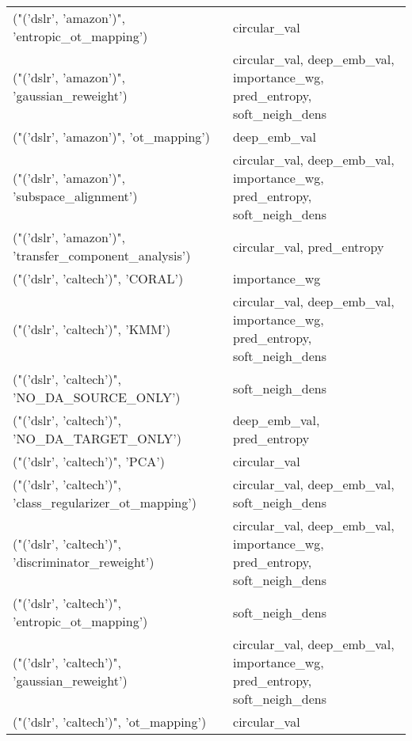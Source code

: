 \begin{tabular}{ll}
 ("('dslr', 'amazon')", 'entropic\_ot\_mapping')             & circular\_val                                                             \\
 ("('dslr', 'amazon')", 'gaussian\_reweight')               & circular\_val, deep\_emb\_val, importance\_wg, pred\_entropy, soft\_neigh\_dens \\
 ("('dslr', 'amazon')", 'ot\_mapping')                      & deep\_emb\_val                                                             \\
 ("('dslr', 'amazon')", 'subspace\_alignment')              & circular\_val, deep\_emb\_val, importance\_wg, pred\_entropy, soft\_neigh\_dens \\
 ("('dslr', 'amazon')", 'transfer\_component\_analysis')     & circular\_val, pred\_entropy                                               \\
 ("('dslr', 'caltech')", 'CORAL')                          & importance\_wg                                                            \\
 ("('dslr', 'caltech')", 'KMM')                            & circular\_val, deep\_emb\_val, importance\_wg, pred\_entropy, soft\_neigh\_dens \\
 ("('dslr', 'caltech')", 'NO\_DA\_SOURCE\_ONLY')              & soft\_neigh\_dens                                                          \\
 ("('dslr', 'caltech')", 'NO\_DA\_TARGET\_ONLY')              & deep\_emb\_val, pred\_entropy                                               \\
 ("('dslr', 'caltech')", 'PCA')                            & circular\_val                                                             \\
 ("('dslr', 'caltech')", 'class\_regularizer\_ot\_mapping')   & circular\_val, deep\_emb\_val, soft\_neigh\_dens                              \\
 ("('dslr', 'caltech')", 'discriminator\_reweight')         & circular\_val, deep\_emb\_val, importance\_wg, pred\_entropy, soft\_neigh\_dens \\
 ("('dslr', 'caltech')", 'entropic\_ot\_mapping')            & soft\_neigh\_dens                                                          \\
 ("('dslr', 'caltech')", 'gaussian\_reweight')              & circular\_val, deep\_emb\_val, importance\_wg, pred\_entropy, soft\_neigh\_dens \\
 ("('dslr', 'caltech')", 'ot\_mapping')                     & circular\_val                                                             \\

\end{tabular}
